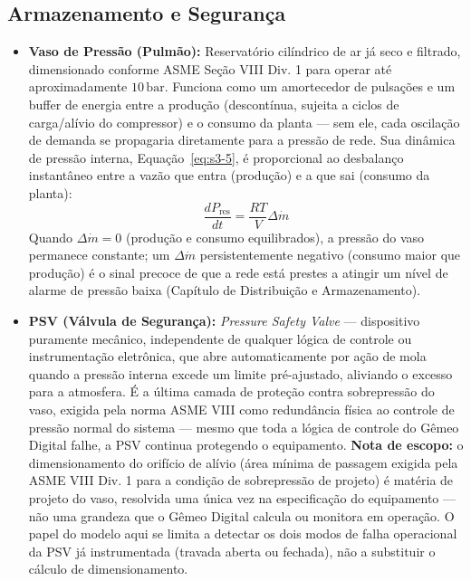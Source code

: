 \documentclass[12pt,a4paper]{article}
\numberwithin{equation}{section}
\numberwithin{table}{section}
\numberwithin{figure}{section}
\begin{document}
{	\subsection{\textbf{Armazenamento e Segurança}}
	\begin{itemize}
		\item \textbf{Vaso de Pressão (Pulmão):} Reservatório cilíndrico de ar já seco e filtrado, dimensionado conforme ASME Seção VIII Div. 1 para operar até aproximadamente $10\,\text{bar}$. Funciona como um amortecedor de pulsações e um buffer de energia entre a produção (descontínua, sujeita a ciclos de carga/alívio do compressor) e o consumo da planta — sem ele, cada oscilação de demanda se propagaria diretamente para a pressão de rede. Sua dinâmica de pressão interna, Equação~\eqref{eq:s3-5}, é proporcional ao desbalanço instantâneo entre a vazão que entra (produção) e a que sai (consumo da planta):
		\begin{equation}\label{eq:s3-5}
 \frac{dP_{\text{res}}}{dt} = \frac{R T}{V} \Delta \dot{m}
\end{equation}
		Quando $\Delta \dot{m} = 0$ (produção e consumo equilibrados), a pressão do vaso permanece constante; um $\Delta \dot{m}$ persistentemente negativo (consumo maior que produção) é o sinal precoce de que a rede está prestes a atingir um nível de alarme de pressão baixa (Capítulo de Distribuição e Armazenamento).
		\item \textbf{PSV (Válvula de Segurança):} \textit{Pressure Safety Valve} — dispositivo puramente mecânico, independente de qualquer lógica de controle ou instrumentação eletrônica, que abre automaticamente por ação de mola quando a pressão interna excede um limite pré-ajustado, aliviando o excesso para a atmosfera. É a última camada de proteção contra sobrepressão do vaso, exigida pela norma ASME VIII como redundância física ao controle de pressão normal do sistema — mesmo que toda a lógica de controle do Gêmeo Digital falhe, a PSV continua protegendo o equipamento. \textbf{Nota de escopo:} o dimensionamento do orifício de alívio (área mínima de passagem exigida pela ASME VIII Div. 1 \cite{asme8} para a condição de sobrepressão de projeto) é matéria de projeto do vaso, resolvida uma única vez na especificação do equipamento — não uma grandeza que o Gêmeo Digital calcula ou monitora em operação. O papel do modelo aqui se limita a detectar os dois modos de falha operacional da PSV já instrumentada (travada aberta ou fechada), não a substituir o cálculo de dimensionamento.
	\end{itemize}
	
}
\end{document}
